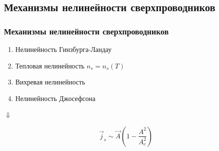 \subsection{Механизмы нелинейности сверхпроводников}
\begin{frame}[c]%
	\frametitle{Механизмы нелинейности сверхпроводников}
	\begin{enumerate}
		\item Нелинейность Гинзбурга-Ландау
		\item Тепловая нелинейность $n_s=n_s(T)$
		\item Вихревая нелинейность
		\item Нелинейность Джосефсона
	\end{enumerate}
\begin{center}
	$\Downarrow$
\end{center}
\begin{equation*}
	\vec{j}_s\sim\vec{A}\left(1-\frac{A^2}{A_c^2}\right)
\end{equation*}

\end{frame}

